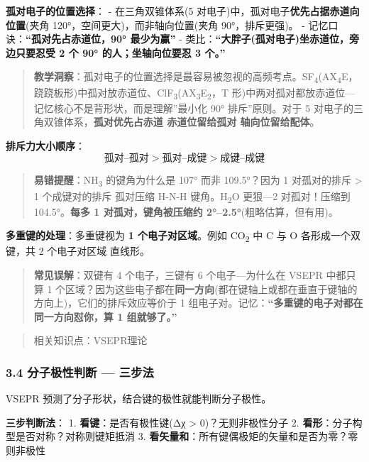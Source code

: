 \textbf{孤对电子的位置选择}：
- 在三角双锥体系(5 对电子)中，孤对电子\textbf{优先占据赤道向位置}(夹角 120°，空间更大)，而非轴向位置(夹角 90°，排斥更强)。
- 记忆口诀：\textbf{``孤对先占赤道位，90° 最少为赢''}
- 类比：\textbf{``大胖子(孤对电子)坐赤道位，旁边只要忍受 2 个 90° 的人；坐轴向位要忍 3 个。''}

\begin{quote}
\textbf{教学洞察}：孤对电子的位置选择是最容易被忽视的高频考点。SF\textsubscript{4}(AX\textsubscript{4}E，跷跷板形)中孤对放赤道位、ClF\textsubscript{3}(AX\textsubscript{3}E\textsubscript{2}，T 形)中两对孤对都放赤道位---记忆核心不是背形状，而是理解''最小化 90° 排斥''原则。对于 5 对电子的三角双锥体系，\textbf{孤对优先占赤道 \箭 赤道位留给孤对 \箭 轴向位留给配体}。
\end{quote}

\textbf{排斥力大小顺序}：
\[
\text{孤对–孤对} > \text{孤对–成键} > \text{成键–成键}
\]

\begin{quote}
\textbf{易错提醒}：NH\textsubscript{3} 的键角为什么是 107° 而非 109.5°？因为 1 对孤对的排斥 \textgreater{} 1 个成键对的排斥 \箭 孤对压缩 H-N-H 键角。H\textsubscript{2}O 更狠---2 对孤对！压缩到 104.5°。\textbf{每多 1 对孤对，键角被压缩约 2°--2.5°}(粗略估算，但有用)。
\end{quote}

\textbf{多重键的处理}：多重键视为 \textbf{1 个电子对区域}。例如 CO\textsubscript{2} 中 C 与 O 各形成一个双键，共 2 个电子对区域 \箭 直线形。

\begin{quote}
\textbf{常见误解}：双键有 4 个电子，三键有 6 个电子---为什么在 VSEPR 中都只算 1 个区域？因为这些电子都在\textbf{同一方向}(都在键轴上或都在垂直于键轴的方向上)，它们的排斥效应等价于 1 组电子对。记忆：\textbf{``多重键的电子对都在同一方向怼你，算 1 组就够了。''}
\end{quote}

\begin{quote}
相关知识点：VSEPR理论
\end{quote}

\subsubsection{3.4 分子极性判断 --- 三步法}\label{ux5206ux5b50ux6781ux6027ux5224ux65ad-ux4e09ux6b65ux6cd5}

VSEPR 预测了分子形状，结合键的极性就能判断分子极性。

\textbf{三步判断法}：
1. \textbf{看键}：是否有极性键(Δχ \textgreater{} 0)？\箭 无则非极性分子
2. \textbf{看形}：分子构型是否对称？\箭 对称则键矩抵消
3. \textbf{看矢量和}：所有键偶极矩的矢量和是否为零？\箭 零则非极性

